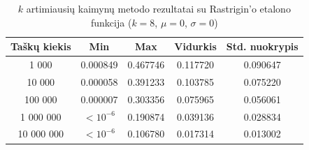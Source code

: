 \begin{table}[H]
    \centering
    \begin{tabular}{|c|c|c|c|c|}
        \hline
        \textbf{Taškų kiekis} & \textbf{Min} & \textbf{Max} & \textbf{Vidurkis} & \textbf{Std. nuokrypis} \\ \hline
        1 000        & 0.000849 & 0.467746 & 0.117720 & 0.090647 \\ \hline
        10 000       & 0.000058 & 0.391233 & 0.103785 & 0.075220 \\ \hline
        100 000      & 0.000007 & 0.303356 & 0.075965 & 0.056061 \\ \hline
        1 000 000    & $<10^{-6}$ & 0.190874 & 0.039136 & 0.028834 \\ \hline
        10 000 000   & $<10^{-6}$ & 0.106780 & 0.017314 & 0.013002 \\ \hline
    \end{tabular}
    \caption{$k$ artimiausių kaimynų metodo rezultatai su Rastrigin'o etalono funkcija ($k = 8$, $\mu = 0$, $\sigma = 0$)}
\end{table}